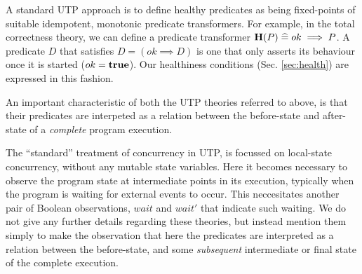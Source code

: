 %
A standard UTP approach is to define healthy predicates
as being fixed-points of suitable idempotent, monotonic predicate transformers.
For example, in the total correctness theory,
we can define a predicate transformer
$\mathbf{H}(P) \mathrel{\widehat=} ok \implies P$.
A predicate $D$ that satisfies $D = (ok \implies D)$
is one that only asserts its behaviour once it is started ($ok=\mathbf{true}$).
Our healthiness conditions (Sec. \ref{sec:health})
are expressed in this fashion.

An important characteristic of both the UTP theories referred to above,
is that their predicates are interpeted as a relation between the before-state
and after-state of a \emph{complete} program execution.

The ``standard'' treatment of concurrency in UTP\cite[Chps. 7,8]{Hoare-He98},
is focussed on local-state concurrency, without any mutable state variables.
Here it becomes necessary to observe the program state at intermediate points
in its execution,
typically when the program is waiting
for external events to occur.
This neccesitates another pair of Boolean observations, $wait$ and $wait'$
that indicate such waiting.
We do not give any further details regarding these theories,
but instead mention them simply to make the observation
that here the predicates are interpreted as a relation between
the before-state,
and some \emph{subsequent} intermediate or final state of the complete execution.

